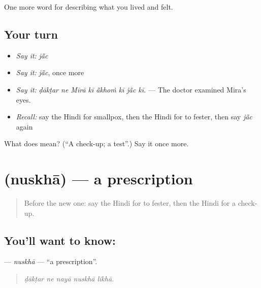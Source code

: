 \begin{grammarlens}[title={What you've built}]
One more word for describing what you lived and felt.
\end{grammarlens}

\subsection*{Your turn}
\begin{itemize}
\raggedright
  \item \emph{Say it:} \emph{jā̃c}
  \item \emph{Say it:} \emph{jā̃c}, once more
  \item \emph{Say it:} \emph{ḍākṭar ne Mīrā kī ā̃khoṁ kī jā̃c kī.} — The doctor examined Mira's eyes.
  \item \emph{Recall:} say the Hindi for smallpox, then the Hindi for to fester, then say \emph{jā̃c} again
\end{itemize}

\begin{tcolorbox}[breakable,colback=teal!4,colframe=teal!35!black,title={Before you move on}]
What does  mean? (\textquotedblleft{}A check-up; a test\textquotedblright{}.) Say it once more.
\end{tcolorbox}
\section[\texorpdfstring{\hi{नुस्ख़ा} (nuskhā)}{नुस्ख़ा (nuskhā)}]{ (nuskhā) — a prescription}

\label{lesson:HI-C488-nuskha}



\begin{quote}
Before the new one: say the Hindi for to fester, then the Hindi for a check-up.
\end{quote}

\subsection*{You'll want to know: }
\textbf{} — \emph{nuskhā} — \textquotedblleft{}a prescription\textquotedblright{}.

\begin{quote}
    
\end{quote}

\begin{quote}
\emph{ḍākṭar ne nayā nuskhā likhā.}
\end{quote}

